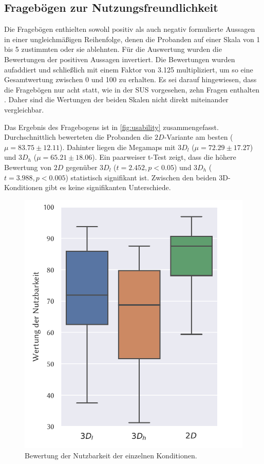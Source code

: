 \subsection{Fragebögen zur Nutzungsfreundlichkeit}
Die Fragebögen enthielten sowohl positiv als auch negativ formulierte Aussagen in einer ungleichmäßigen Reihenfolge, denen die Probanden auf einer Skala von 1 bis 5 zustimmten oder sie ablehnten.
Für die Auswertung wurden die Bewertungen der positiven Aussagen invertiert.
Die Bewertungen wurden aufaddiert und schließlich mit einem Faktor von \num{3,125} multipliziert, um so eine Gesamtwertung zwischen 0 und 100 zu erhalten.
Es sei darauf hingewiesen, dass die Fragebögen nur acht statt, wie in der SUS vorgesehen, zehn Fragen enthalten \autocite{Brooke2013}. 
Daher sind die Wertungen der beiden Skalen nicht direkt miteinander vergleichbar.

Das Ergebnis des Fragebogens ist in \autoref{fig:usability} zusammengefasst.
Durchschnittlich bewerteten die Probanden die $2D$-Variante am besten ($\mu = \num{83,75} \pm \num{12,11}$).
Dahinter liegen die Megamaps mit $3D_l$ ($\mu = \num{72,29} \pm \num{17,27}$) und $3D_h$ ($\mu = \num{65,21} \pm \num{18.06}$).
Ein paarweiser t-Test zeigt, dass die höhere Bewertung von $2D$ gegenüber $3D_l$ ($t = 2.452, p < 0.05$) und $3D_h$ ($t = 3.988, p < 0.005$) statistisch signifikant ist.
Zwischen den beiden 3D-Konditionen gibt es keine signifikanten Unterschiede.
\begin{figure}[h]
    \centering
    \includegraphics[width=0.7\linewidth]{figures/analysis/usability}
    \caption{Bewertung der Nutzbarkeit der einzelnen Konditionen.}
    \label{fig:usability}
\end{figure}

